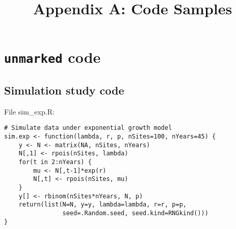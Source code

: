 \documentclass[12pt]{article}
\begin{document}
\title{Appendix A: Code Samples}
\date{} %
\maketitle
\section{\texttt{unmarked} code}

\subsection{Simulation study code}

File sim\_exp.R:
\begin{verbatim}
# Simulate data under exponential growth model
sim.exp <- function(lambda, r, p, nSites=100, nYears=45) {
    y <- N <- matrix(NA, nSites, nYears)
    N[,1] <- rpois(nSites, lambda)
    for(t in 2:nYears) {
        mu <- N[,t-1]*exp(r)
        N[,t] <- rpois(nSites, mu)
    }
    y[] <- rbinom(nSites*nYears, N, p)
    return(list(N=N, y=y, lambda=lambda, r=r, p=p,
                seed=.Random.seed, seed.kind=RNGkind()))
}
\end{verbatim}
\end{document}
